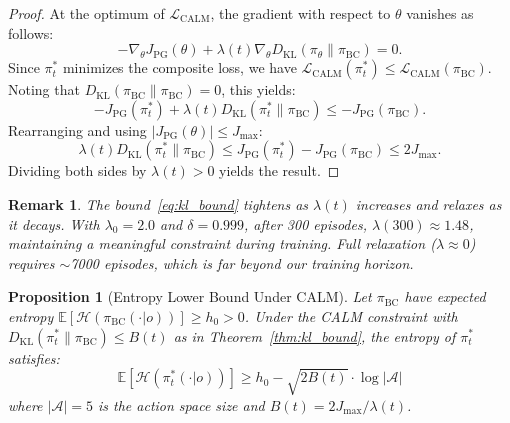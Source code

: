 \documentclass[journal]{IEEEtran}
\newtheorem{proposition}{Proposition}
\newtheorem{remark}{Remark}
\newcommand{\KL}{\mathrm{KL}}
\newcommand{\E}{\mathbb{E}}
\newcommand{\cA}{\mathcal{A}}
\begin{document}
\begin{proof}
At the optimum of $\mathcal{L}_{\text{CALM}}$, the gradient with respect to $\theta$ vanishes as follows:
\begin{equation}
    -\nabla_\theta J_{\text{PG}}(\theta) + \lambda(t) \nabla_\theta D_{\KL}(\pi_\theta \| \pi_{\text{BC}}) = 0.
\end{equation}
Since $\pi_t^*$ minimizes the composite loss, we have $\mathcal{L}_{\text{CALM}}(\pi_t^*) \leq \mathcal{L}_{\text{CALM}}(\pi_{\text{BC}})$.
Noting that $D_{\KL}(\pi_{\text{BC}} \| \pi_{\text{BC}}) = 0$, this yields:
\begin{equation}
    -J_{\text{PG}}(\pi_t^*) + \lambda(t) D_{\KL}(\pi_t^* \| \pi_{\text{BC}}) \leq -J_{\text{PG}}(\pi_{\text{BC}}).
\end{equation}
Rearranging and using $|J_{\text{PG}}(\theta)| \leq J_{\max}$:
\begin{equation}
    \lambda(t) D_{\KL}(\pi_t^* \| \pi_{\text{BC}}) \leq J_{\text{PG}}(\pi_t^*) - J_{\text{PG}}(\pi_{\text{BC}}) \leq 2J_{\max}.
\end{equation}
Dividing both sides by $\lambda(t) > 0$ yields the result.
\end{proof}

\begin{remark}
The bound~\eqref{eq:kl_bound} tightens as $\lambda(t)$ increases and relaxes as it decays. With $\lambda_0 = 2.0$ and $\delta = 0.999$, after 300 episodes, $\lambda(300) \approx 1.48$, maintaining a meaningful constraint during training. Full relaxation ($\lambda \approx 0$) requires $\sim$7000 episodes, which is far beyond our training horizon.
\end{remark}

\begin{proposition}[Entropy Lower Bound Under CALM]
\label{prop:entropy_bound}
Let $\pi_{\text{BC}}$ have expected entropy $\E[\mathcal{H}(\pi_{\text{BC}}(\cdot|o))] \geq h_0 > 0$. Under the CALM constraint with $D_{\KL}(\pi_t^* \| \pi_{\text{BC}}) \leq B(t)$ as in Theorem~\ref{thm:kl_bound}, the entropy of $\pi_t^*$ satisfies:
\begin{equation}
    \E\left[\mathcal{H}(\pi_t^*(\cdot|o))\right] \geq h_0 - \sqrt{2 B(t)} \cdot \log|\cA|
    \label{eq:entropy_bound}
\end{equation}
where $|\cA| = 5$ is the action space size and $B(t) = 2J_{\max}/\lambda(t)$.
\end{proposition}
\end{document}

